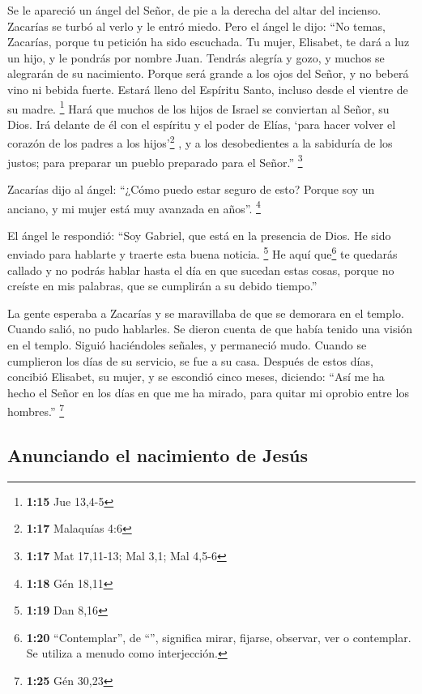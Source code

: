 \begin{paracol}{2}
 Se le apareció un ángel del Señor, de pie a la derecha
del altar del incienso.  Zacarías se turbó al verlo y le
entró miedo.  Pero el ángel le dijo: ``No temas,
Zacarías, porque tu petición ha sido escuchada. Tu mujer, Elisabet, te
dará a luz un hijo, y le pondrás por nombre Juan. 
Tendrás alegría y gozo, y muchos se alegrarán de su nacimiento.
 Porque será grande a los ojos del Señor, y no beberá
vino ni bebida fuerte. Estará lleno del Espíritu Santo, incluso desde el
vientre de su madre. \footnote{\textbf{1:15} Jue 13,4-5} 
Hará que muchos de los hijos de Israel se conviertan al Señor, su Dios.
 Irá delante de él con el espíritu y el poder de Elías,
`para hacer volver el corazón de los padres a los hijos'\footnote{\textbf{1:17}
  Malaquías 4:6} , y a los desobedientes a la sabiduría de los justos;
para preparar un pueblo preparado para el Señor.'' \footnote{\textbf{1:17}
  Mat 17,11-13; Mal 3,1; Mal 4,5-6}

 Zacarías dijo al ángel: ``¿Cómo puedo estar seguro de
esto? Porque soy un anciano, y mi mujer está muy avanzada en años''.
\footnote{\textbf{1:18} Gén 18,11}

 El ángel le respondió: ``Soy Gabriel, que está en la
presencia de Dios. He sido enviado para hablarte y traerte esta buena
noticia. \footnote{\textbf{1:19} Dan 8,16}  He aquí
que\footnote{\textbf{1:20} ``Contemplar'', de ``'',
  significa mirar, fijarse, observar, ver o contemplar. Se utiliza a
  menudo como interjección.} te quedarás callado y no podrás hablar
hasta el día en que sucedan estas cosas, porque no creíste en mis
palabras, que se cumplirán a su debido tiempo.''

 La gente esperaba a Zacarías y se maravillaba de que se
demorara en el templo.  Cuando salió, no pudo hablarles.
Se dieron cuenta de que había tenido una visión en el templo. Siguió
haciéndoles señales, y permaneció mudo.  Cuando se
cumplieron los días de su servicio, se fue a su casa. 
Después de estos días, concibió Elisabet, su mujer, y se escondió cinco
meses, diciendo:  ``Así me ha hecho el Señor en los días
en que me ha mirado, para quitar mi oprobio entre los hombres.''
\footnote{\textbf{1:25} Gén 30,23}

\hypertarget{anunciando-el-nacimiento-de-jesuxfas}{%
\subsection{Anunciando el nacimiento de
Jesús}\label{anunciando-el-nacimiento-de-jesuxfas}}


\end{paracol}
